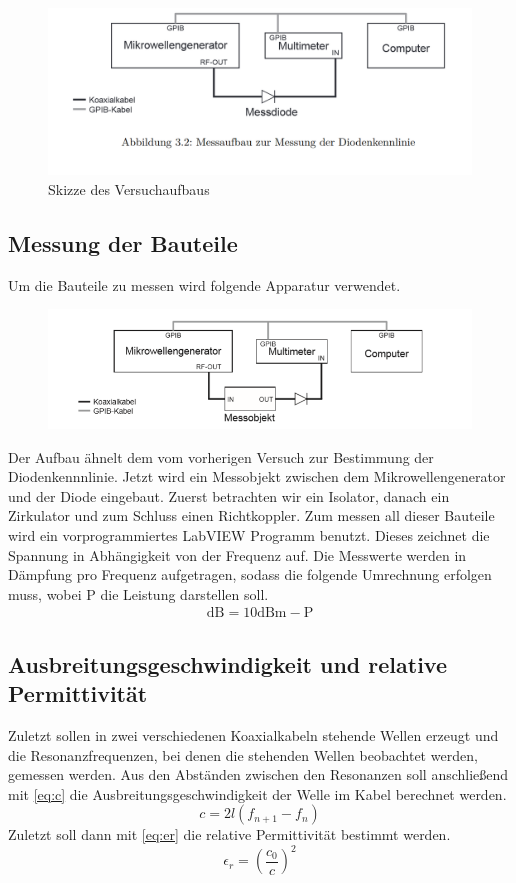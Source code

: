 \begin{figure}[h]
	\centering
	\includegraphics[scale=0.4]{Diode_Aufbau.PNG}
	\caption{Skizze des Versuchaufbaus}
	\label{Aufbau}
\end{figure}

\subsection{Messung der Bauteile}
Um die Bauteile zu messen wird folgende Apparatur verwendet.
\begin{figure}[h!]
	\centering
	\includegraphics[scale = 1]{Mess.PNG}
	\caption{}
	\label{}
\end{figure}
Der Aufbau ähnelt dem vom vorherigen Versuch zur Bestimmung der Diodenkennnlinie. Jetzt wird ein Messobjekt zwischen dem Mikrowellengenerator und der Diode eingebaut. Zuerst betrachten wir ein Isolator, danach ein Zirkulator und zum Schluss einen Richtkoppler. Zum messen all dieser Bauteile wird ein vorprogrammiertes LabVIEW Programm benutzt. Dieses zeichnet die Spannung in Abhängigkeit von der Frequenz auf. Die Messwerte werden in Dämpfung pro Frequenz aufgetragen, sodass die folgende Umrechnung erfolgen muss, wobei P die Leistung darstellen soll.
\begin{align}
	\text{dB} = 10\text{dBm} - \text{P}
	\label{F1}
\end{align}

\subsection{Ausbreitungsgeschwindigkeit und relative Permittivität}
Zuletzt sollen in zwei verschiedenen Koaxialkabeln stehende Wellen erzeugt und die Resonanzfrequenzen, bei denen die stehenden Wellen beobachtet werden, gemessen werden. Aus den Abständen zwischen den Resonanzen soll anschließend mit \cref{eq:c} die Ausbreitungsgeschwindigkeit der Welle im Kabel berechnet werden.
\begin{equation}
c = 2l(f_{n+1} - f_n)
\label{eq:c}
\end{equation}
Zuletzt soll dann mit \cref{eq:er} die relative Permittivität bestimmt werden.
\begin{equation}
\epsilon_r = \left( \frac{c_0}{c}\right) ^2
\label{eq:er}
\end{equation}


